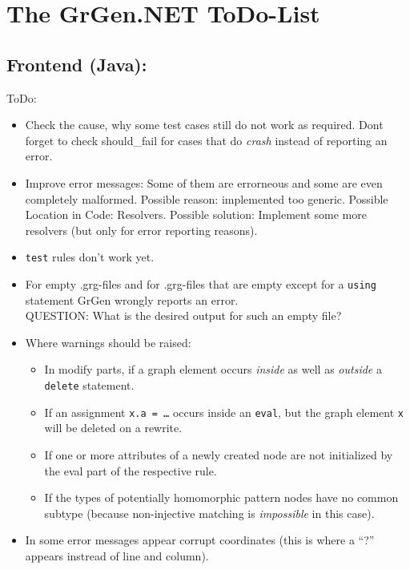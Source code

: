 \documentclass[12pt,a4paper]{article}
\begin{document}
\section*{\LARGE The GrGen.NET ToDo-List}



\subsection*{Frontend (Java):}
ToDo:
\begin{itemize}
	\item Check the cause, why some test cases still do not work as required.
		Dont forget to check should\_fail for cases that do \emph{crash} instead of reporting an error.
	\item Improve error messages: Some of them are errorneous and some are even completely malformed. Possible reason: implemented too generic. Possible Location in Code: Resolvers. Possible solution: Implement some more resolvers (but only for error reporting reasons).
    \item {\tt test} rules don't work yet.
	\item For empty .grg-files and for .grg-files that are empty except for a {\tt using} statement GrGen wrongly reports an error.\\
		QUESTION: What is the desired output for such an empty file?
	\item Where warnings should be raised:
		\begin{itemize}
			\item In modify parts, if a graph element occurs \emph{inside} as well as \emph{outside} a {\tt delete} statement.
			\item If an assignment {\tt x.a = \dots} occurs inside an {\tt eval}, but the graph element {\tt x} will be deleted on a rewrite.
			\item If one or more attributes of a newly created node are not initialized by the eval part of the respective rule.
			\item If the types of potentially homomorphic pattern nodes have no common subtype (because non-injective matching is \emph{impossible} in this case).
		\end{itemize}
	\item In some error messages appear corrupt coordinates (this is where a "`?"' appears instread of line and column).
\end{itemize}
\end{document}
